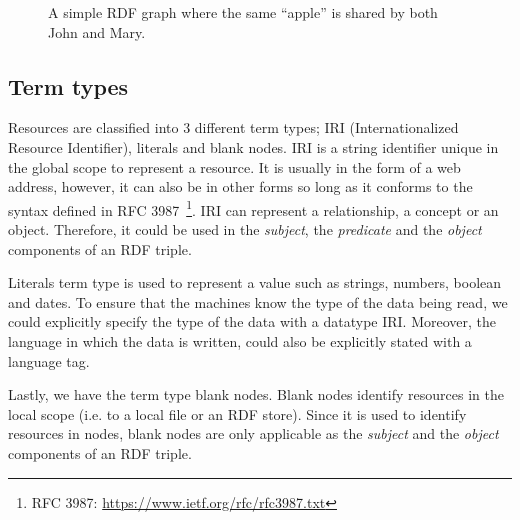 \begin{figure}[htbp]
\centering
{}
\caption{A simple RDF graph where the same “apple” is shared by both John and Mary.}
\label{fig:rdf_graph_ex}
\end{figure}

\subsection{Term types}
Resources are classified into 3 different term types; IRI (Internationalized Resource Identifier),
literals and blank nodes. IRI is a string identifier unique in the global scope to
represent a resource. It is usually in the form of a web address, however, it can
also be in other forms so long as it conforms to the syntax defined in
RFC 3987~\footnote{RFC 3987: \url{https://www.ietf.org/rfc/rfc3987.txt}}.
IRI can represent a relationship, a concept or an object. Therefore, it could be
used in the \textit{subject}, the \textit{predicate} and the \textit{object} components of
an RDF triple.

Literals term type is used to represent a value such as strings, numbers, boolean and dates.
To ensure that the machines know the type of the data being read, we could
explicitly specify the type of the data with a datatype IRI. Moreover, the
language in which the data is written, could also be explicitly stated with
a language tag.

Lastly, we have the term type blank nodes. Blank nodes identify resources
in the local scope (i.e. to a local file or an RDF store). Since it is used to
identify resources in nodes, blank nodes are only applicable as the \textit{subject}
and the \textit{object} components of an RDF triple.


